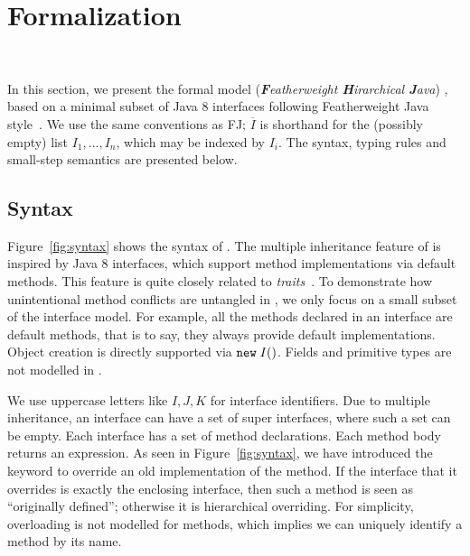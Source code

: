 \section{Formalization}~\label{sec:formalization}


In this section, we present the formal model \MIM{} (\emph{\textbf{F}eatherweight \textbf{H}irarchical \textbf{J}ava}) , based on
a minimal subset of Java 8 interfaces following Featherweight Java style~\cite{Igarashi01FJ}. We use the same
conventions as FJ; $\overline{I}$ is shorthand for the (possibly empty)
list $I_1, ..., I_n$, which may be indexed by $I_i$.
The syntax, typing rules and small-step semantics are presented below.

\subsection{Syntax}
Figure~\ref{fig:syntax} shows the syntax of \MIM{}. The multiple
inheritance feature of \MIM{} is inspired by Java 8 interfaces, which support
method implementations via default methods. This feature is quite
closely related to \emph{traits}~\cite{scharli03traits}.  To demonstrate how
unintentional method conflicts are untangled in \MIM{}, we only focus on a small
subset of the interface model. For example, all the methods declared
in an interface are default methods, that is to say, they always
provide default implementations. 
Object creation is directly supported via $\texttt{new} \; I()$. 
Fields and primitive types are not modelled in \MIM{}.

We use uppercase letters like $I, J, K$ for interface identifiers. 
Due to multiple inheritance, an interface can have a set of
super interfaces, where such a set can be empty. Each interface
has a set of method declarations. Each method body returns
an expression. As seen in Figure~\ref{fig:syntax}, we have introduced the
\kwoverride{} keyword to override an old implementation of the
method. If the interface that it overrides is exactly the enclosing
interface, then such a method is seen as ``originally defined''; otherwise
it is hierarchical overriding.
For simplicity, overloading is not modelled for methods, which
implies we can uniquely identify a method by its name.

